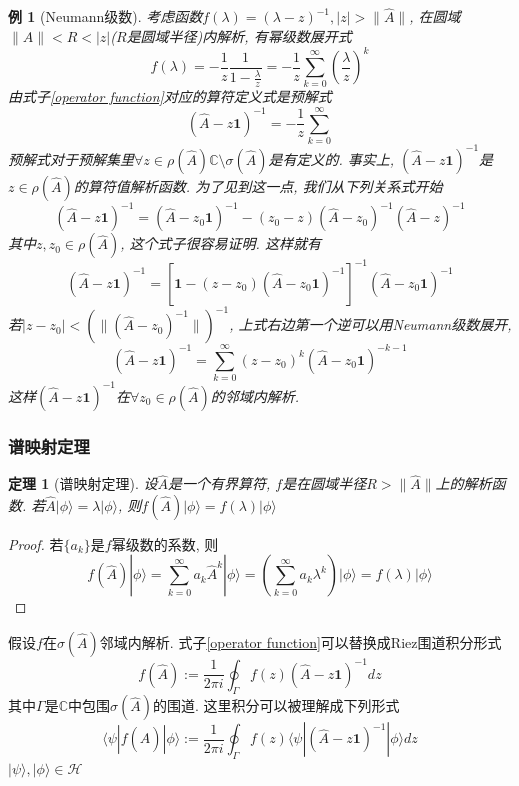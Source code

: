 \documentclass[a4paper,11pt]{book}
\newtheorem{theorem}{\hspace{2em}定理}[section]
\newtheorem{proof}{证明}[section]
\newtheorem{example}{例}[section]
\begin{document}
\begin{example}[Neumann级数]
  考虑函数$f(\lambda)=(\lambda-z)^{-1},|z|>\|\hat{A}\|$, 在圆域$\|\hat{A}\|<R<|z|$($R$是圆域半径)内解析, 有幂级数展开式
  \begin{equation*}
    f(\lambda)=-\frac{1}{z}\frac{1}{1-\frac{\lambda}{z}}=-\frac{1}{z}\sum_{k=0}^{\infty}(\frac{\lambda}{z})^k
  \end{equation*}
  由式子\eqref{operator function}对应的算符定义式是预解式
  \begin{equation*}
    (\hat{A}-z\mathbf{1})^{-1}=-\frac{1}{z}\sum_{k=0}^{\infty}
  \end{equation*}
  预解式对于预解集里$\forall z\in\rho(\hat{A})\mathbb{C}\setminus\sigma(\hat{A})$是有定义的. 事实上, $(\hat{A}-z\mathbf{1})^{-1}$是$z\in\rho(\hat{A})$的算符值解析函数. 为了见到这一点, 我们从下列关系式开始
  \begin{equation*}
    (\hat{A}-z\mathbf{1})^{-1}=(\hat{A}-z_0\mathbf{1})^{-1}-(z_0-z)(\hat{A}-z_0)^{-1}(\hat{A}-z)^{-1}
  \end{equation*}
  其中$z,z_0\in\rho(\hat{A})$, 这个式子很容易证明. 这样就有
  \begin{equation*}
    (\hat{A}-z\mathbf{1})^{-1}=[\mathbf{1}-(z-z_0)(\hat{A}-z_0\mathbf{1})^{-1}]^{-1}(\hat{A}-z_0\mathbf{1})^{-1}
  \end{equation*}
  若$|z-z_0|<(\|(\hat{A}-z_0)^{-1}\|)^{-1}$, 上式右边第一个逆可以用Neumann级数展开,
  \begin{equation*}
    (\hat{A}-z\mathbf{1})^{-1}=\sum_{k=0}^{\infty}(z-z_0)^k(\hat{A}-z_0\mathbf{1})^{-k-1}
  \end{equation*}
  这样$(\hat{A}-z\mathbf{1})^{-1}$在$\forall z_0\in\rho(\hat{A})$的邻域内解析.
\end{example}
\subsubsection{谱映射定理}
\begin{theorem}[谱映射定理]
  设$\hat{A}$是一个有界算符, $f$是在圆域半径$R>\|\hat{A}\|$上的解析函数. 若$\hat{A}|\phi\rangle=\lambda|\phi\rangle$, 则$f(\hat{A})|\phi\rangle=f(\lambda)|\phi\rangle$
\end{theorem}
\begin{proof}
  若$\{a_k\}$是$f$幂级数的系数, 则
  \begin{equation*}
    f(\hat{A})|\phi\rangle=\sum_{k=0}^{\infty}a_k\hat{A}^k|\phi\rangle=(\sum_{k=0}^{\infty}a_k\lambda^k)|\phi\rangle=f(\lambda)|\phi\rangle
  \end{equation*}
\end{proof}
假设$f$在$\sigma(\hat{A})$邻域内解析. 式子\ref{operator function}可以替换成Riez围道积分形式
\begin{equation}\label{Riez integral}
  f(\hat{A}):=\frac{1}{2\pi i}\oint_\Gamma f(z)(\hat{A}-z\mathbf{1})^{-1}dz
\end{equation}
其中$\Gamma$是$\mathbb{C}$中包围$\sigma(\hat{A})$的围道. 这里积分可以被理解成下列形式
\begin{equation*}
  \langle\psi|f(\hat{A})|\phi\rangle:=\frac{1}{2\pi i}\oint_{\Gamma}f(z)\langle\psi|(\hat{A}-z\mathbf{1})^{-1}|\phi\rangle dz
\end{equation*}
$|\psi\rangle,|\phi\rangle\in\mathcal{H}$
\end{document}
